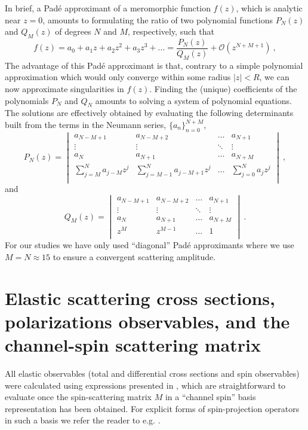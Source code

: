 \documentclass[aps,prc,showpacs,twocolumn,floatfix,nobibnotes,nofootinbib,amsmath,amssymb,longbibliography]{revtex4-2}
\begin{document}
In brief, a Pad\'e approximant of a meromorphic function $f(z)$, which
is analytic near $z=0$, amounts to formulating the ratio of two
polynomial functions $P_N(z)$ and $Q_M(z)$ of degrees $N$ and $M$,
respectively, such that
\begin{equation}
	f(z) = a_0 + a_1z + a_2z^2 + a_3z^3 + \ldots = \frac{P_{N}(z)}{Q_{M}(	z)} + \mathcal{O}(z^{N+M+1}) \:,
	\label{eq | general neumann series}
\end{equation}
The advantage of this Pad\'e approximant is that, contrary to a simple polynomial
approximation which would only converge within some radius $|z|<R$, we
can now approximate singularities in $f(z)$. Finding the (unique)
coefficients of the polynomials $P_N$ and $Q_N$ amounts to solving a
system of polynomial equations. The solutions are effectively obtained
by evaluating the following determinants built from the terms in
the Neumann series, $\{a_n\}_{n=0}^{N+M}$,
\begin{equation}
	P_N(z) = \begin{vmatrix}
	a_{N-M+1} & a_{N-M+2} & \ldots & a_{N+1} \\
	\vdots & \vdots & \ddots & \vdots \\
	a_{N} & a_{N+1} & \ldots & a_{N+M} \\
	\sum\limits_{j=M}^N a_{j-M}z^j & \sum\limits_{j=M-1}^N a_{j-M+1}z^j & \ldots & \sum\limits_{j=0}^N a_{j}z^j \\
	\end{vmatrix} \:,
	\label{eq | Pade P-polynomial}
\end{equation}
and
\begin{equation}
	Q_M(z) = \begin{vmatrix}
	a_{N-M+1} & a_{N-M+2} & \ldots & a_{N+1} \\
	\vdots & \vdots & \ddots & \vdots \\
	a_{N} & a_{N+1} & \ldots & a_{N+M} \\
	z^M & z^{M-1} & \ldots & 1 \\
	\end{vmatrix} \:.
	\label{eq | Pade Q-polynomial}
\end{equation}
For our studies we have only used ``diagonal'' Pad\'e approximants
where we use $M=N\approx 15$ to ensure a convergent scattering
amplitude.

\section{Elastic scattering cross sections, polarizations observables, and the channel-spin scattering matrix}
\label{app | observables}
All elastic \Nd{} observables (total and differential cross sections
and spin observables) were calculated using expressions presented in
\cite{Ohlsen:1972zz}, which are straightforward to evaluate once the
spin-scattering matrix $M$ in a ``channel spin'' basis representation
has been obtained. For explicit forms of spin-projection operators in
such a basis we refer the reader to e.g. \cite{Seyler:1969sii}.
\end{document}

